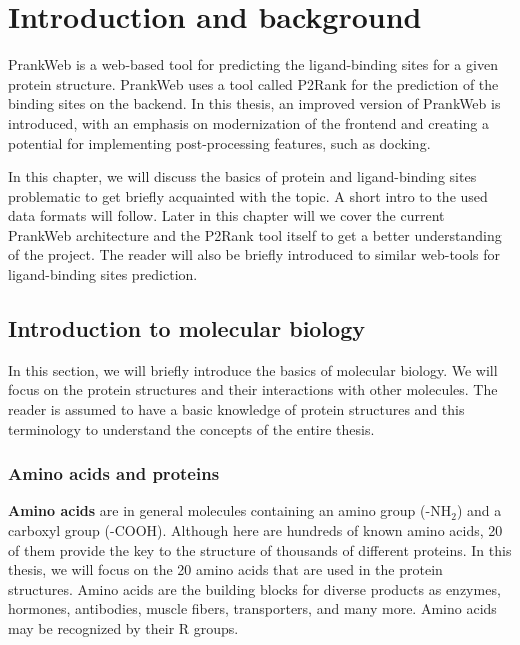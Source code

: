\chapter{Introduction and background}
\label{chap:intro}

PrankWeb is a web-based tool for predicting the ligand-binding sites for a given protein structure. PrankWeb uses a tool called P2Rank for the prediction of the binding sites on the backend. In this thesis, an improved version of PrankWeb is introduced, with an emphasis on modernization of the frontend and creating a potential for implementing post-processing features, such as docking.

In this chapter, we will discuss the basics of protein and ligand-binding sites problematic to get briefly acquainted with the topic. A short intro to the used data formats will follow. Later in this chapter will we cover the current PrankWeb architecture and the P2Rank tool itself to get a better understanding of the project. The reader will also be briefly introduced to similar web-tools for ligand-binding sites prediction.

\section{Introduction to molecular biology}
\label{sec:mol_bio}

In this section, we will briefly introduce the basics of molecular biology. We will focus on the protein structures and their interactions with other molecules. The reader is assumed to have a basic knowledge of protein structures and this terminology to understand the concepts of the entire thesis.

\subsection{Amino acids and proteins}
\label{subsec:amino_acids}

\textbf{Amino acids} are in general molecules containing an amino group (-NH$_2$) and a carboxyl group (-COOH). Although here are hundreds of known amino acids, 20 of them provide the key to the structure of thousands of different proteins. In this thesis, we will focus on the 20 amino acids that are used in the protein structures. Amino acids are the building blocks for diverse products as enzymes, hormones, antibodies, muscle fibers, transporters, and many more. Amino acids may be recognized by their R groups. \cite{nelson2008lehninger}

